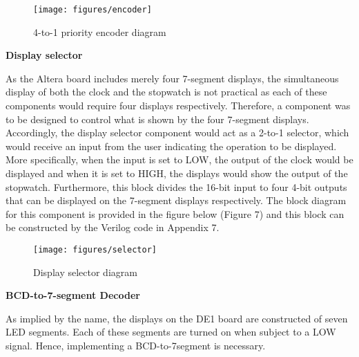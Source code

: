 \documentclass[12pt,a4paper]{article}
\begin{document}
	\begin{figure}[H]
		\centering
		\texttt{[image: figures/encoder]}
		\caption{4-to-1 priority encoder diagram}
	\end{figure}


	\noindent \textbf{\large Display selector}
	\vspace{0.2cm}
	
	\noindent As the Altera board includes merely four 7-segment displays, the simultaneous display of both the clock and the stopwatch is not practical as each of these components would require four displays respectively. Therefore, a component was to be designed to control what is shown by the four 7-segment displays. Accordingly, the display selector component would act as a 2-to-1 selector, which would receive an input from the user indicating the operation to be displayed. More specifically, when the input is set to LOW, the output of the clock would be displayed and when it is set to HIGH, the displays would show the output of the stopwatch. Furthermore, this block divides the 16-bit input to four 4-bit outputs that can be displayed on the 7-segment displays respectively. The block diagram for this component is provided in the figure below (Figure 7) and this block can be constructed by the Verilog code in Appendix 7.
	
	\vspace{-0.2cm}
	\begin{figure}[H]
		\centering
		\texttt{[image: figures/selector]}
		\caption{Display selector diagram}
	\end{figure}

	\vspace{-0.2cm}
	\noindent \textbf{\large BCD-to-7-segment Decoder}
	\vspace{0.2cm}
	
	\noindent As implied by the name, the displays on the DE1 board are constructed of seven LED segments. Each of these segments are turned on when subject to a LOW signal. Hence, implementing a BCD-to-7segment is necessary.
	
\end{document}

